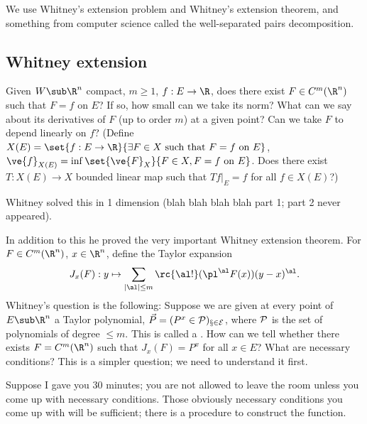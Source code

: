 
We use
Whitney's extension problem and Whitney's extension theorem, and something from computer science called the well-separated pairs decomposition.

\subsection{Whitney extension}

\begin{prb}[Whitney, 1934]
Given $W\sub \R^n$ compact, $m\ge 1$, $f:E\to \R$, does there exist $F\in C^m(\R^n)$ such that $F=f$ on $E$?
If so, how small can we take its norm? 
What can we say about its derivatives of $F$ (up to order $m$) at a given point?
Can we take $F$ to depend linearly on $f$?
(Define $X(E)=\set{f:E\to \R}{\exists F\in X \text{ such that }F=f\text{ on }E}$, $\ve{f}_{X(E)}=\inf \set{\ve{F}_X}{F\in X,F=f\text{ on }E}$. Does there exist $T:X(E)\to X$ bounded linear map such that $Tf|_E=f$ for all $f\in X(E)$?)
\end{prb}
Whitney solved this in 1 dimension (blah blah blah blah part 1; part 2 never appeared). 

In addition to this he proved the very important Whitney extension theorem.
For $F\in C^m(\R^n)$, $x\in \R^n$, define the Taylor expansion 
\begin{align}
J_x(F): y\mapsto \sum_{|\al|\le m} \rc{\al!} (\pl^\al F(x)) (y-x)^\al.
\end{align}
Whitney's question is the following: Suppose we are given at every point of $E\sub \R^n$ a Taylor polynomial, $\vec P = (P^x\in \cal P)_{x\in E}$, where $\cal P$ is the set of polynomials of degree $\le m$. This is called a . 
How can we tell whether there exists $F=C^m(\R^n)$ such that $J_x(F)=P^x$ for all $x\in E$? What are necessary conditions?
This is a simpler question; we need to understand it first. 

Suppose I gave you 30 minutes; you are not allowed to leave the room unless you come up with necessary conditions. Those obviously necessary conditions you come up with will be  sufficient; there is a procedure to construct the function.

